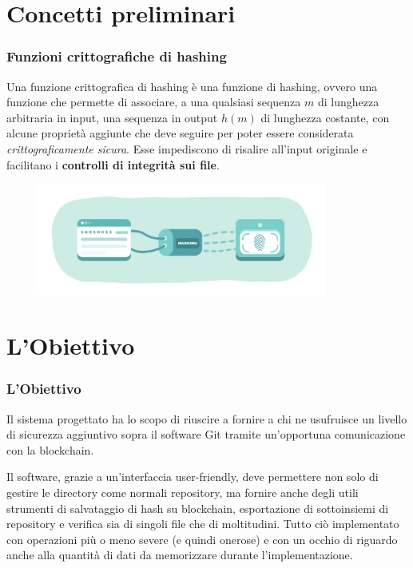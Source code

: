 \documentclass{beamer}
\begin{document}
\section{Concetti preliminari}
\begin{frame}
	\frametitle{Funzioni crittografiche di hashing}
	Una funzione crittografica di hashing è una funzione di hashing, ovvero
	una funzione che permette di associare,
	a una qualsiasi sequenza \(m\) di lunghezza arbitraria in input, una sequenza
	in output \(h(m)\) di lunghezza costante,
	con alcune proprietà aggiunte che deve seguire per poter essere considerata
	\emph{crittograficamente sicura}. Esse impediscono di risalire all'input originale
	e facilitano i \textbf{controlli di integrità sui file}.
	\medskip
	\begin{figure}
		\includegraphics[width=0.85\textwidth]{figures/hashing.jpg}
	\end{figure}
\end{frame}

\section{L'Obiettivo}
\begin{frame}
	\frametitle{L'Obiettivo}
	Il sistema progettato ha lo scopo di riuscire a fornire a chi ne usufruisce
	un livello di sicurezza aggiuntivo sopra il software Git tramite un'opportuna
	comunicazione con la blockchain.

	Il software, grazie a un'interfaccia user-friendly, deve permettere non solo di gestire
	le directory come normali repository, ma fornire
	anche degli utili strumenti di salvataggio di hash su blockchain,
	esportazione di sottoinsiemi di repository
	e verifica sia di singoli file che di moltitudini.
	Tutto ciò implementato con operazioni più o meno severe (e quindi onerose)
	e con un occhio di riguardo anche alla quantità di
	dati da memorizzare durante l'implementazione.
\end{frame}
\end{document}
